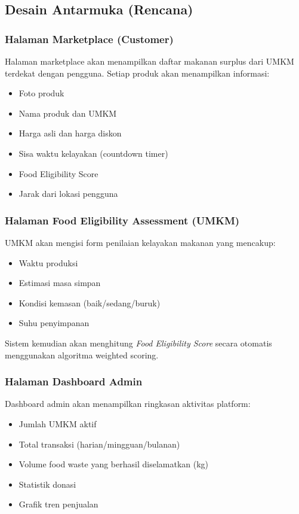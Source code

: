 \subsection{Desain Antarmuka (Rencana)}

\subsubsection{Halaman Marketplace (Customer)}
Halaman marketplace akan menampilkan daftar makanan surplus dari UMKM terdekat dengan pengguna. Setiap produk akan menampilkan informasi:
\begin{itemize}[leftmargin=*]
    \item Foto produk
    \item Nama produk dan UMKM
    \item Harga asli dan harga diskon
    \item Sisa waktu kelayakan (countdown timer)
    \item Food Eligibility Score
    \item Jarak dari lokasi pengguna
\end{itemize}

\subsubsection{Halaman Food Eligibility Assessment (UMKM)}
UMKM akan mengisi form penilaian kelayakan makanan yang mencakup:
\begin{itemize}[leftmargin=*]
    \item Waktu produksi
    \item Estimasi masa simpan
    \item Kondisi kemasan (baik/sedang/buruk)
    \item Suhu penyimpanan
\end{itemize}

Sistem kemudian akan menghitung \textit{Food Eligibility Score} secara otomatis menggunakan algoritma weighted scoring.

\subsubsection{Halaman Dashboard Admin}
Dashboard admin akan menampilkan ringkasan aktivitas platform:
\begin{itemize}[leftmargin=*]
    \item Jumlah UMKM aktif
    \item Total transaksi (harian/mingguan/bulanan)
    \item Volume food waste yang berhasil diselamatkan (kg)
    \item Statistik donasi
    \item Grafik tren penjualan
\end{itemize}

